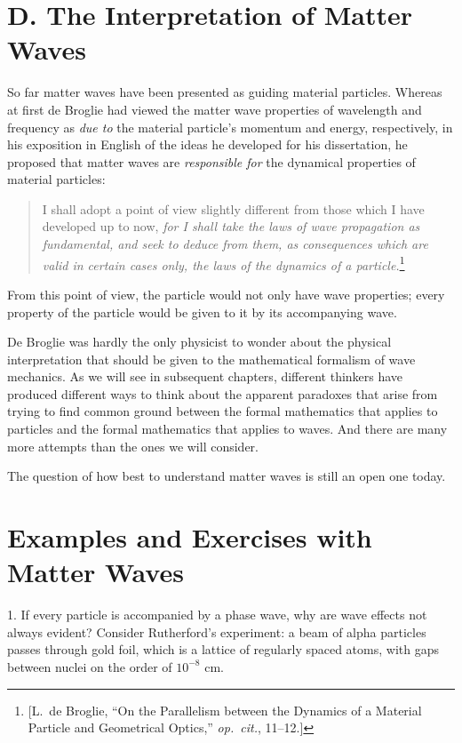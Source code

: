 \section*{D. The Interpretation of Matter Waves}

So far matter waves have been presented as guiding material particles.
Whereas at first de Broglie had viewed the matter wave properties of
wavelength and frequency as \emph{due to} the material particle's
momentum and energy, respectively, in his exposition in English of the
ideas he developed for his dissertation, he proposed that matter waves
are \emph{responsible for} the dynamical properties of material
particles:

\begin{quote}
I shall adopt a point of view slightly different from those which I have
developed up to now, \emph{for I shall take the laws of wave propagation
as fundamental, and seek to deduce from them, as consequences which are
valid in certain cases only, the laws of the dynamics of a
particle.}\footnote{{[}L.\ de Broglie, ``On the Parallelism between the
  Dynamics of a Material Particle and Geometrical Optics,'' \emph{op.\ 
  cit.}, 11--12.{]}}
\end{quote}

From this point of view, the particle would not only have wave
properties; every property of the particle would be given to it by its
accompanying wave.

De Broglie was hardly the only physicist to wonder about the physical
interpretation that should be given to the mathematical formalism of
wave mechanics. As we will see in subsequent chapters, different
thinkers have produced different ways to think about the apparent
paradoxes that arise from trying to find common ground between the
formal mathematics that applies to particles and the formal mathematics
that applies to waves. And there are many more attempts than the ones we
will consider.

The question of how best to understand matter waves is still an open one
today.


\section*{Examples and Exercises with Matter Waves}

1. If every particle is accompanied by a phase wave, why are wave
effects not always evident? Consider Rutherford's experiment: a beam of
alpha particles passes through gold foil, which is a lattice of
regularly spaced atoms, with gaps between nuclei on the order of
$10^{-8}$ cm.

